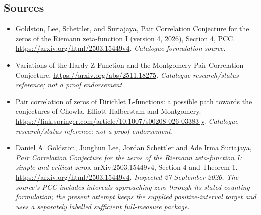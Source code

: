 \documentclass[11pt,a4paper]{article}
\numberwithin{equation}{section}
\begin{document}
\subsection{Sources}
\begin{itemize}\raggedright
\item[\textnormal{[S1]}]\hypertarget{source:statement:1}{} Goldston, Lee, Schettler, and Suriajaya, Pair Correlation Conjecture for the zeros of the Riemann zeta-function I (version 4, 2026), Section 4, PCC.
\url{https://arxiv.org/html/2503.15449v4}.
{\small\textit{Catalogue formulation source.}}
\item[\textnormal{[S2]}]\hypertarget{source:statement:2}{} Variations of the Hardy Z-Function and the Montgomery Pair Correlation Conjecture.
\url{https://arxiv.org/abs/2511.18275}.
{\small\textit{Catalogue research/status reference; not a proof endorsement.}}
\item[\textnormal{[S3]}]\hypertarget{source:statement:3}{} Pair correlation of zeros of Dirichlet L-functions: a possible path towards the conjectures of Chowla, Elliott-Halberstam and Montgomery.
\url{https://link.springer.com/article/10.1007/s00208-026-03383-y}.
{\small\textit{Catalogue research/status reference; not a proof endorsement.}}
\item[\textnormal{[E1]}]\hypertarget{extra:statement:1}{} Daniel A. Goldston,
Junghun Lee, Jordan Schettler and Ade Irma Suriajaya,
\emph{Pair Correlation Conjecture for the zeros of the Riemann zeta-function I:
simple and critical zeros}, arXiv:2503.15449v4, Section 4 and Theorem 1.
\url{https://arxiv.org/html/2503.15449v4}.
{\small\textit{Inspected 27 September 2026. The source's PCC includes
intervals approaching zero through its stated counting formulation;
the present attempt keeps the supplied positive-interval target and uses
a separately labelled sufficient full-measure package.}}
\end{itemize}
\end{document}
